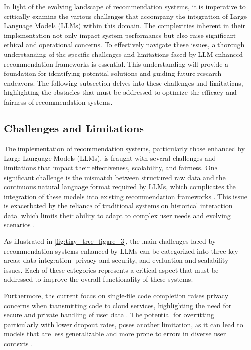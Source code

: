 In light of the evolving landscape of recommendation systems, it is imperative to critically examine the various challenges that accompany the integration of Large Language Models (LLMs) within this domain. The complexities inherent in their implementation not only impact system performance but also raise significant ethical and operational concerns. To effectively navigate these issues, a thorough understanding of the specific challenges and limitations faced by LLM-enhanced recommendation frameworks is essential. This understanding will provide a foundation for identifying potential solutions and guiding future research endeavors. The following subsection delves into these challenges and limitations, highlighting the obstacles that must be addressed to optimize the efficacy and fairness of recommendation systems.





\subsection{Challenges and Limitations} \label{subsec:Challenges and Limitations}

The implementation of recommendation systems, particularly those enhanced by Large Language Models (LLMs), is fraught with several challenges and limitations that impact their effectiveness, scalability, and fairness. One significant challenge is the mismatch between structured raw data and the continuous natural language format required by LLMs, which complicates the integration of these models into existing recommendation frameworks \cite{wang2023multiple}. This issue is exacerbated by the reliance of traditional systems on historical interaction data, which limits their ability to adapt to complex user needs and evolving scenarios \cite{zhiyuli2023bookgptgeneralframeworkbook}.

As illustrated in \autoref{fig:tiny_tree_figure_3}, the main challenges faced by recommendation systems enhanced by LLMs can be categorized into three key areas: data integration, privacy and security, and evaluation and scalability issues. Each of these categories represents a critical aspect that must be addressed to improve the overall functionality of these systems.

Furthermore, the current focus on single-file code completion raises privacy concerns when transmitting code to cloud services, highlighting the need for secure and private handling of user data \cite{zhang2024llm}. The potential for overfitting, particularly with lower dropout rates, poses another limitation, as it can lead to models that are less generalizable and more prone to errors in diverse user contexts \cite{tian2024mmrecllmbasedmultimodal}.

